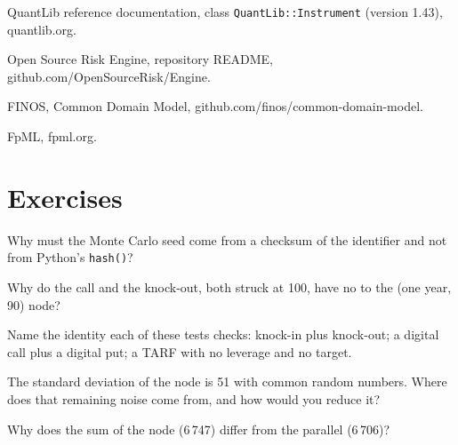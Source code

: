 \begin{omsources}
\item QuantLib reference documentation, class \texttt{QuantLib::Instrument} (version 1.43), quantlib.org.
\item Open Source Risk Engine, repository README, github.com/OpenSourceRisk/Engine.
\item FINOS, Common Domain Model, github.com/finos/common-domain-model.
\item FpML, fpml.org.
\end{omsources}

\section{Exercises}

\begin{exercise}[$\star$]\label{exo:dv:build-a-pricing-library:1}
Why must the Monte Carlo seed come from a checksum of the identifier and not from Python's \texttt{hash()}?
\end{exercise}

\begin{exercise}[$\star$]\label{exo:dv:build-a-pricing-library:2}
Why do the call and the knock-out, both struck at 100, have no  to the (one year, 90) node?
\end{exercise}

\begin{exercise}[$\star$]\label{exo:dv:build-a-pricing-library:3}
Name the identity each of these tests checks: knock-in plus knock-out; a digital call plus a digital put; a TARF with no leverage and no target.
\end{exercise}

\begin{exercise}[$\star\star$]\label{exo:dv:build-a-pricing-library:4}
The standard deviation of the node  is 51 with common random numbers. Where does that remaining noise come from, and how would you reduce it?
\end{exercise}

\begin{exercise}[$\star\star$]\label{exo:dv:build-a-pricing-library:5}
Why does the sum of the node  (6\,747) differ from the parallel  (6\,706)?
\end{exercise}

